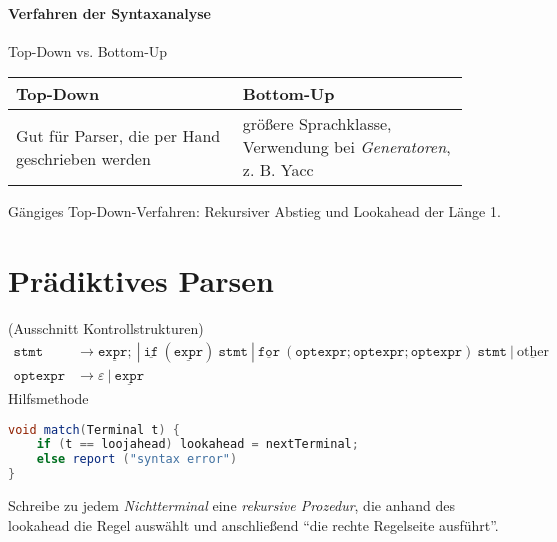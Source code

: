 \paragraph*{Verfahren der Syntaxanalyse} Top-Down vs. Bottom-Up
\begin{center}
\end{center}
\begin{center}
 \begin{tabular}{p{0.45\linewidth}|p{0.45\linewidth}}
  \textbf{Top-Down} & \textbf{Bottom-Up} \\\hline\hline
   Gut für Parser, die per Hand geschrieben werden & größere Sprachklasse, Verwendung bei \emph{Generatoren}, z. B. Yacc
 \end{tabular}
\end{center}

Gängiges Top-Down-Verfahren: Rekursiver Abstieg und Lookahead der Länge 1.

\section{Prädiktives Parsen}
\Bsp (Ausschnitt Kontrollstrukturen)
\begin{align*}
    \texttt{stmt} &\to \underline{\texttt{expr};}\ |\ \underline{\texttt{if}}\ (\underline{\texttt{expr}})\ \texttt{stmt}\ |\ \underline{\texttt{for}}\ (\texttt{optexpr}; \texttt{optexpr}; \texttt{optexpr})\ \texttt{stmt}\ |\ \underline{\text{other}} \\
     \texttt{optexpr} &\to \varepsilon\ |\ \underline{\texttt{expr}}
\end{align*}
Hilfsmethode
\begin{lstlisting}[language=Java]
void match(Terminal t) {
    if (t == loojahead) lookahead = nextTerminal;
    else report ("syntax error")
}
\end{lstlisting}
Schreibe zu jedem \emph{Nichtterminal} eine \emph{rekursive Prozedur}, die anhand des lookahead die Regel auswählt und anschließend "`die rechte Regelseite ausführt"'.

